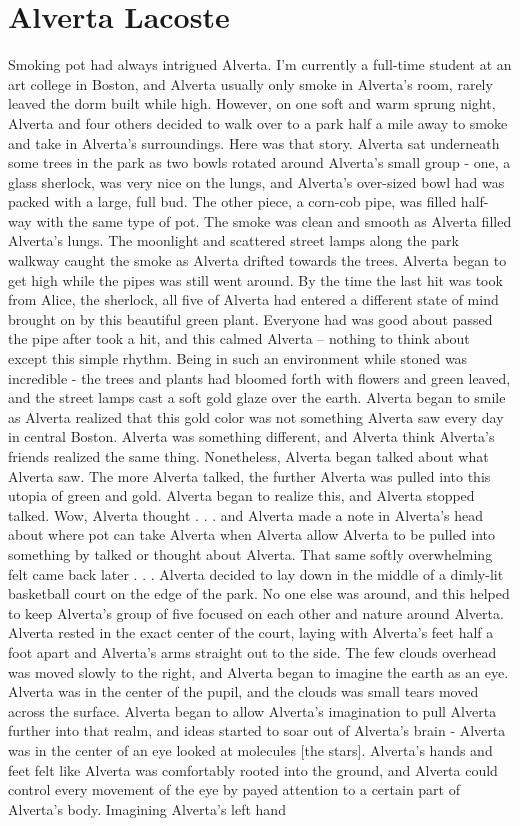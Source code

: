 \documentclass[12pt]{book}
\begin{document}
\chapter{Alverta Lacoste}

Smoking pot had always intrigued Alverta. I'm currently a full-time student at an art college in Boston, and Alverta usually only smoke in Alverta's room, rarely leaved the dorm built while high. However, on one soft and warm sprung night, Alverta and four others decided to walk over to a park half a mile away to smoke and take in Alverta's surroundings. Here was that story. Alverta sat underneath some trees in the park as two bowls rotated around Alverta's small group - one, a glass sherlock, was very nice on the lungs, and Alverta's over-sized bowl had was packed with a large, full bud. The other piece, a corn-cob pipe, was filled half-way with the same type of pot. The smoke was clean and smooth as Alverta filled Alverta's lungs. The moonlight and scattered street lamps along the park walkway caught the smoke as Alverta drifted towards the trees. Alverta began to get high while the pipes was still went around. By the time the last hit was took from Alice, the sherlock, all five of Alverta had entered a different state of mind brought on by this beautiful green plant. Everyone had was good about passed the pipe after took a hit, and this calmed Alverta -- nothing to think about except this simple rhythm. Being in such an environment while stoned was incredible - the trees and plants had bloomed forth with flowers and green leaved, and the street lamps cast a soft gold glaze over the earth. Alverta began to smile as Alverta realized that this gold color was not something Alverta saw every day in central Boston. Alverta was something different, and Alverta think Alverta's friends realized the same thing. Nonetheless, Alverta began talked about what Alverta saw. The more Alverta talked, the further Alverta was pulled into this utopia of green and gold. Alverta began to realize this, and Alverta stopped talked. Wow, Alverta thought . . .  and Alverta made a note in Alverta's head about where pot can take Alverta when Alverta allow Alverta to be pulled into something by talked or thought about Alverta. That same softly overwhelming felt came back later . . .  Alverta decided to lay down in the middle of a dimly-lit basketball court on the edge of the park. No one else was around, and this helped to keep Alverta's group of five focused on each other and nature around Alverta. Alverta rested in the exact center of the court, laying with Alverta's feet half a foot apart and Alverta's arms straight out to the side. The few clouds overhead was moved slowly to the right, and Alverta began to imagine the earth as an eye. Alverta was in the center of the pupil, and the clouds was small tears moved across the surface. Alverta began to allow Alverta's imagination to pull Alverta further into that realm, and ideas started to soar out of Alverta's brain - Alverta was in the center of an eye looked at molecules [the stars]. Alverta's hands and feet felt like Alverta was comfortably rooted into the ground, and Alverta could control every movement of the eye by payed attention to a certain part of Alverta's body. Imagining Alverta's left hand 
\end{document}
